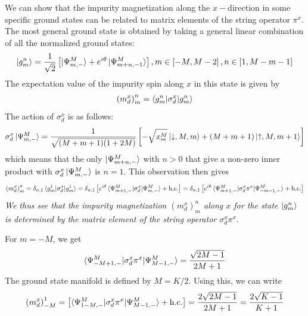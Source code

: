 \documentclass[12pt]{revtex4-2}
\begin{document}
We can show that the impurity magnetization along the \(x-\)direction in some specific ground states can be related to matrix elements of the string operator \(\pi^x\). The most general ground state is obtained by taking a general linear combination of all the normalized ground states:
\begin{align}
	\ket{g^n_m} = \frac{1}{\sqrt 2}\left[\ket{\Psi^M_{m,-}} + e^{i\theta}\ket{\Psi^M_{m+n,-1}}\right], m \in \left[-M, M-2\right] , n \in \left[1, M - m - 1\right] 
\end{align}
The expectation value of the impurity spin along \(x\) in this state is given by
\begin{align}
	\left(m_d^x\right)_m^n = \braket{g^n_m | \sigma_d^x | g^n_m}
\end{align}
The action of \(\sigma_d^x\) is as follows:
\begin{align}
	\sigma_d^x \ket{\Psi^M_{m,-}} = \frac{1}{\sqrt{(M+m+1)(1+2M)}}\left[-\sqrt{x_m^M}\ket{\downarrow, M, m} + \left(M + m + 1\right)\ket{\uparrow,M,m+1}\right]
\end{align}
which means that the only \(\ket{\Psi^M_{m+n,-}}\) with \(n > 0\) that give a non-zero inner product with \(\sigma_d^x \ket{\Psi^M_{m,-}}\) is \(n=1\). This observation then gives
\begin{align}
	\left(m_d^x\right)_m^n = \delta_{n,1}\braket{g^1_m | \sigma_d^x | g^1_m} = \delta_{n,1}\left[e^{i\theta}\braket{\Psi^M_{m+1,-}|\sigma_d^x| \Psi^M_{m,-}} + \text{h.c.}\right] = \delta_{n,1}\left[e^{i\theta}\braket{\Psi^M_{m+1,-}|\sigma_d^x \pi^x | \Psi^M_{-m-1,-}} + \text{h.c.}\right]
\end{align}
\textit{We thus see that the impurity magnetization \(\left(m_d^x\right)_m^n\) along \(x\) for the state \(\ket{g^n_m}\) is determined by the matrix element of the string operator \(\sigma^x_d \pi^x\)}.

For \(m = -M\), we get
\begin{align}
	\braket{\Psi^M_{-M+1,-}|\sigma_d^x \pi^x | \Psi^M_{M - 1,-}} = \frac{\sqrt{2M-1}}{2M + 1}
\end{align}
The ground state manifold is defined by \(M = K/2\). Using this, we can write
\begin{align}
	\left(m_d^x\right)_{-M}^1 = \left[\braket{\Psi^M_{1-M,-}|\sigma_d^x \pi^x | \Psi^M_{M - 1,-}} + \text{h.c.}\right] = \frac{2\sqrt{2M-1}}{2M + 1} = \frac{2\sqrt{K-1}}{K+1}
\end{align}
\end{document}
